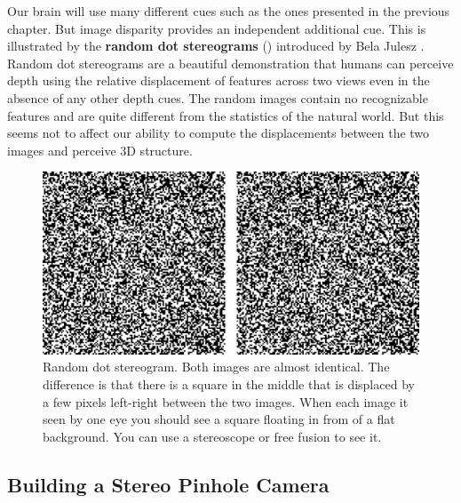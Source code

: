 Our brain will use many different cues such as the ones presented in the previous chapter. But image disparity provides an independent additional cue. This is illustrated by the {\bf random dot stereograms}
(\fig{\ref{fig:random_dot_stereogram}}) introduced by Bela Julesz \cite{Julez1971}. Random dot stereograms are a beautiful demonstration that humans can perceive depth using the relative displacement of features across two views even in the absence of any other depth cues. The random images contain no recognizable features and are quite different from the statistics of the natural world. But this seems not to affect our ability to compute the displacements between the two images and perceive 3D structure.

\begin{figure}
    \centerline{
        \includegraphics[width=1\linewidth]{figures/3d_scene_understanding/random_dot_stereogram.eps}
    }
    \caption{Random dot stereogram. Both images are almost identical. The difference is that there is a square in the middle that is displaced by a few pixels left-right between the two images. When each image it seen by one eye you should see a square floating in from of a flat background. You can use a stereoscope or free fusion to see it. %
    }
    \label{fig:random_dot_stereogram}
\end{figure}



\subsection{Building a Stereo Pinhole Camera}

